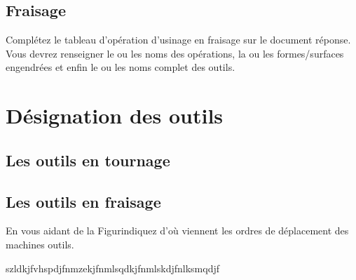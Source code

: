 \documentclass[12pt]{article}
\newcounter{exo}
\newenvironment{exo}{\stepcounter{exo}\vspace{0.5cm}{\bfseries Question \theexo\ :}}{\par\vspace{0.5cm}}
\begin{document}
\subsection{Fraisage}
\begin{exo} Complétez le tableau d'opération d'usinage en fraisage sur le document réponse. Vous devrez renseigner le ou les noms des opérations, la ou les formes/surfaces engendrées et enfin le ou les noms complet des outils.  \end{exo}






\section{Désignation des outils}
\subsection{Les outils en tournage}
\subsection{Les outils en fraisage}


\begin{exo}\label{exo1} En vous aidant de la Figurindiquez d'où viennent les ordres de déplacement des machines outils.\end{exo}


\begin{tcolorbox}[colback=blue!5!white,colframe=red!75!black]
  \bcinfo szldkjfvhspdjfnmzekjfnmlsqdkjfnmlskdjfnlksmqdjf
\end{tcolorbox}
\end{document}

